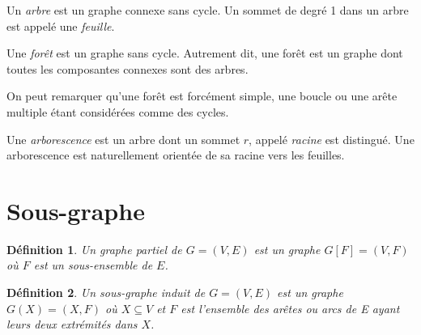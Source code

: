 \documentclass[11pt,a4paper]{report}
\newtheorem{definition}{Définition}
\begin{document}
Un {\em arbre} est un graphe connexe sans cycle. Un sommet de degré 1 dans un arbre est appelé une {\em feuille}.

Une {\em forêt} est un graphe sans cycle. Autrement dit, une forêt est un graphe dont toutes les composantes connexes sont des arbres.

On peut remarquer qu'une forêt est forcément simple, une boucle ou une arête multiple étant considérées comme des cycles.

Une {\em arborescence} est un arbre dont un sommet $r$, appelé {\em racine} est distingué. Une arborescence est naturellement orientée de sa racine vers les feuilles.


\section{Sous-graphe}

\begin{definition}
Un graphe {\em partiel} de $G = (V,E)$ est un graphe $G[F] = (V,F)$ o\`u
$F$ est un sous-ensemble de $E$.
\end{definition}

\begin{definition}
Un {\em sous-graphe induit} de $G = (V,E)$ est un graphe $G(X) = (X,F)$ o\`u
$X \subseteq V$ et $F$ est l'ensemble des ar\^etes ou arcs de E ayant leurs deux extr\'emit\'es
dans $X$.
\end{definition}
\end{document}
